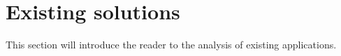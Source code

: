 
\chapter{Existing solutions}\label{ch:existing-solutions}

This section will introduce the reader to the analysis of existing applications.








